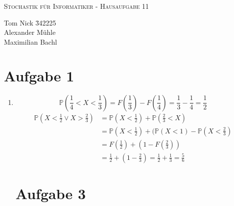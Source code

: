 \documentclass[10pt,a4paper,parskip=half]{scrartcl}
\newcommand{\PP}{\mathbb{P}}
\begin{document}
\begin{center}
\textsc{\Large{Stochastik für Informatiker - Hausaufgabe 11}} \\
\end{center}
\begin{tabbing}
Tom Nick \hspace{1.4cm}\= 342225\\
Alexander Mühle\\
Maximilian Bachl
\end{tabbing}

\section*{Aufgabe 1}
\begin{enumerate}
\item
$$\PP(\frac14 < X < \frac13) = F(\frac13) - F(\frac14) = \frac13 - \frac14 = \frac12$$
\begin{align*}
\PP(X < \frac12 \lor X > \frac23) &= \PP(X < \frac12) + \PP(\frac23 < X) \\
&= \PP(X < \frac12) + (\PP(X < 1) - \PP(X < \frac23) \\
&= F(\frac12) + (1 - F(\frac23)) \\ 
&= \frac12 + (1 - \frac23) = \frac12 + \frac13 = \frac56
\end{align*}

\section*{Aufgabe 3}


\end{enumerate}
\end{document}
